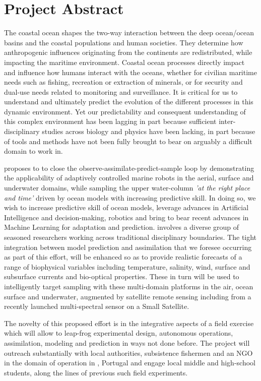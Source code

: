 \section*{Project Abstract}
\label{sec:abs}

The coastal ocean shapes the two-way interaction between the deep
ocean/ocean basins and the coastal populations and human societies. They
determine how anthropogenic influences originating from the continents
are redistributed, while impacting the maritime environment. Coastal
ocean processes directly impact and influence how humans interact with
the oceans, whether for civilian maritime needs such as fishing,
recreation or extraction of minerals, or for security and dual-use needs
related to monitoring and surveillance. It is critical for us to
understand and ultimately predict the evolution of the different
processes in this dynamic environment. Yet our predictability and
consequent understanding of this complex environment has been lagging in
part because sufficient inter-disciplinary studies across biology and
physics have been lacking, in part because of tools and methods have not
been fully brought to bear on arguably a difficult domain to work in.

\proj proposes to to close the observe-assimilate-predict-sample loop
by demonstrating the applicability of adaptively controlled marine
robots in the aerial, surface and underwater domains, while sampling
the upper water-column \emph{'at the right place and time'} driven by
ocean models with increasing predictive skill. In doing so, we wish to
increase predictive skill of ocean models, leverage advances in
Artificial Intelligence and decision-making, robotics and bring to
bear recent advances in Machine Learning for adaptation and
prediction. \proj involves a diverse group of seasoned researchers
working across traditional disciplinary boundaries. The tight
integration between model prediction and assimilation that we foresee
occurring as part of this effort, will be enhanced so as to provide
realistic forecasts of a range of biophysical variables including
temperature, salinity, wind, surface and subsurface currents and
bio-optical properties. These in turn will be used to intelligently
target sampling with these multi-domain platforms in the air, ocean
surface and underwater, augmented by satellite remote sensing
including from a recently launched multi-spectral sensor on a Small
Satellite.

The novelty of this proposed effort is in the integrative aspects of a
field exercise which will allow \proj to leap-frog experimental
design, autonomous operations, assimilation, modeling and prediction
in ways not done before. The project will outreach substantially with
local authorities, subsistence fishermen and an NGO in the domain of
operation in \naze, Portugal and engage local middle and high-school
students, along the lines of previous such field experiments.
